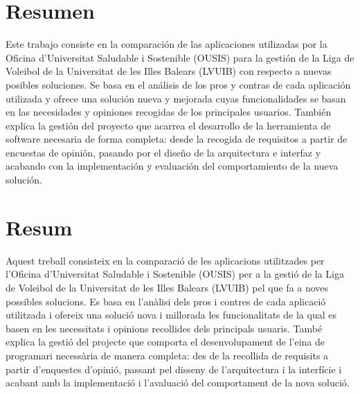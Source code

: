 \chapter{Resumen}

Este trabajo consiste en la comparación de las aplicaciones utilizadas por la Oficina
d’Universitat Saludable i Sostenible (OUSIS) para la gestión de la Liga de Voleibol de
la Universitat de les Illes Balears (LVUIB) con respecto a nuevas posibles soluciones. Se basa en el análisis de los pros y contras de cada aplicación utilizada y ofrece una solución nueva y mejorada cuyas funcionalidades se basan en las necesidades y opiniones recogidas de los principales usuarios. También explica la gestión del proyecto que acarrea el desarrollo de la herramienta de software necesaria de forma completa: desde la recogida de requisitos a partir de encuestas de opinión, pasando por el diseño de la arquitectura e interfaz y acabando con la implementación y evaluación del comportamiento de la nueva solución.

\chapter{Resum}
Aquest treball consisteix en la comparació de les aplicacions utilitzades per l'Oficina
d’Universitat Saludable i Sostenible (OUSIS) per a la gestió de la Liga de Voleibol de
la Universitat de les Illes Balears (LVUIB) pel que fa a noves possibles solucions. Es basa en l'anàlisi dels pros i contres de cada aplicació utilitzada i ofereix una solució nova i millorada les funcionalitats de la qual es basen en les necessitats i opinions recollides dels principals usuaris. També explica la gestió del projecte que comporta el desenvolupament de l'eina de programari necessària de manera completa: des de la recollida de requisits a partir d'enquestes d'opinió, passant pel disseny de l'arquitectura i la interfície i acabant amb la implementació i l'avaluació del comportament de la nova solució.